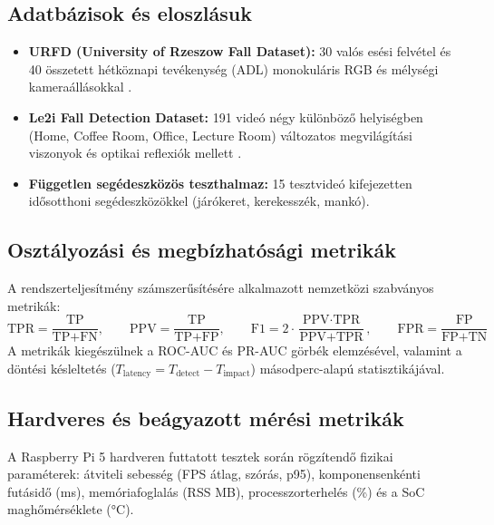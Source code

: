 \documentclass[12pt,a4paper,oneside]{report}
\begin{document}
\subsection{Adatbázisok és eloszlásuk}
\begin{itemize}
    \item \textbf{URFD (University of Rzeszow Fall Dataset):} 30 valós esési felvétel és 40 összetett hétköznapi tevékenység (ADL) monokuláris RGB és mélységi kameraállásokkal \cite{urfd2014}.
    \item \textbf{Le2i Fall Detection Dataset:} 191 videó négy különböző helyiségben (Home, Coffee Room, Office, Lecture Room) változatos megvilágítási viszonyok és optikai reflexiók mellett \cite{le2i2013}.
    \item \textbf{Független segédeszközös teszthalmaz:} 15 tesztvideó kifejezetten idősotthoni segédeszközökkel (járókeret, kerekesszék, mankó).
\end{itemize}

\subsection{Osztályozási és megbízhatósági metrikák}
A rendszerteljesítmény számszerűsítésére alkalmazott nemzetközi szabványos metrikák:
\begin{equation}
\text{TPR} = \frac{\text{TP}}{\text{TP} + \text{FN}}, \qquad \text{PPV} = \frac{\text{TP}}{\text{TP} + \text{FP}}, \qquad \text{F1} = 2 \cdot \frac{\text{PPV} \cdot \text{TPR}}{\text{PPV} + \text{TPR}}, \qquad \text{FPR} = \frac{\text{FP}}{\text{FP} + \text{TN}}
\end{equation}
A metrikák kiegészülnek a ROC-AUC és PR-AUC görbék elemzésével, valamint a döntési késleltetés ($T_{\text{latency}} = T_{\text{detect}} - T_{\text{impact}}$) másodperc-alapú statisztikájával.

\subsection{Hardveres és beágyazott mérési metrikák}
A Raspberry Pi 5 hardveren futtatott tesztek során rögzítendő fizikai paraméterek: átviteli sebesség (FPS átlag, szórás, p95), komponensenkénti futásidő (ms), memóriafoglalás (RSS MB), processzorterhelés (\%) és a SoC maghőmérséklete (°C).
\end{document}
